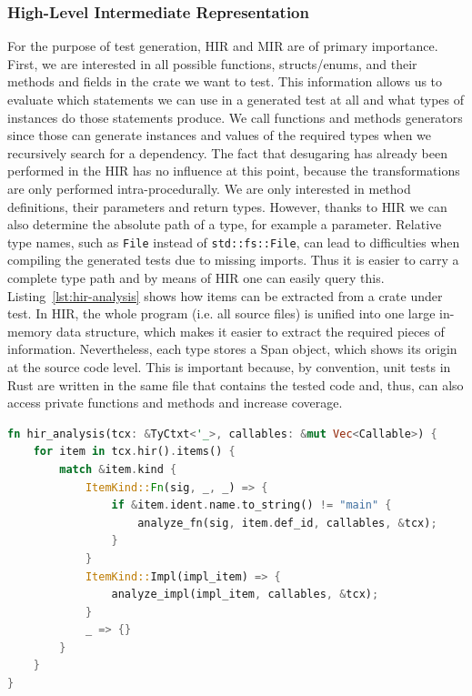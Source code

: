 \documentclass{article}
\begin{document}
\subsubsection{High-Level Intermediate Representation}
For the purpose of test generation, \ac{HIR} and \ac{MIR} are of primary importance. First, we are interested in all possible functions, structs/enums, and their methods and fields in the crate we want to test. This information allows us to evaluate which statements we can use in a generated test at all and what types of instances do those statements produce. We call functions and methods generators since those can generate instances and values of the required types when we recursively search for a dependency. The fact that desugaring has already been performed in the \ac{HIR} has no influence at this point, because the transformations are only performed intra-procedurally. We are only interested in method definitions, their parameters and return types. However, thanks to \ac{HIR} we can also determine the absolute path of a type, for example a parameter. Relative type names, such as \lstinline{File} instead of \lstinline{std::fs::File}, can lead to difficulties when compiling the generated tests due to missing imports. Thus it is easier to carry a complete type path and by means of \ac{HIR} one can easily query this. Listing~\ref{lst:hir-analysis} shows how items can be extracted from a crate under test. In \ac{HIR}, the whole program (i.e. all source files) is unified into one large in-memory data structure, which makes it easier to extract the required pieces of information. Nevertheless, each type stores a Span object, which shows its origin at the source code level. This is important because, by convention, unit tests in Rust are written in the same file that contains the tested code and, thus, can also access private functions and methods and increase coverage.

\begin{lstlisting}[language=Rust, style=boxed, caption={Iterate over the items in the HIR of a crate}, label=lst:hir-analysis]
fn hir_analysis(tcx: &TyCtxt<'_>, callables: &mut Vec<Callable>) {
    for item in tcx.hir().items() {
        match &item.kind {
            ItemKind::Fn(sig, _, _) => {
                if &item.ident.name.to_string() != "main" {
                    analyze_fn(sig, item.def_id, callables, &tcx);
                }
            }
            ItemKind::Impl(impl_item) => {
                analyze_impl(impl_item, callables, &tcx);
            }
            _ => {}
        }
    }
}
\end{lstlisting}
\end{document}
